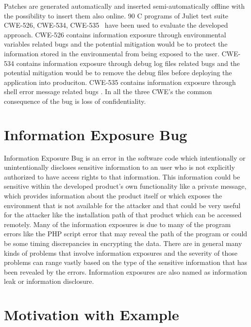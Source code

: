 Patches are generated automatically and inserted semi-automatically offline
with the possibility to insert them also online.
90 C programs of Juliet test suite CWE-526, CWE-534, CWE-535~\cite{mitre:CWE} have been used to evaluate the developed approach. 
CWE-526 contains
information exposure through environmental variables related bugs and the potential mitigation would be to protect the 
information stored in the environmental from being exposed to the user. CWE-534 contains information 
exposure through debug log files related bugs and the potential mitigation would be to remove the 
debug files before deploying the application into produciton. CWE-535 contains information exposure through
shell error message related bugs . In all the three CWE's the common consequence of the bug is
loss of confidentiality.




\section{Information Exposure Bug}

Information Exposure Bug is an error in the software code which intentionally or unintentionally discloses sensitive information to an user who is 
not explicitly authorized to have access rights to that information.
This information could be sensitive within the developed product's own functionality like a private message, which provides information
about the product itself or which exposes the environment that is not available for the attacker and that could be very useful for the attacker like the 
installation path of that product which can be accessed remotely.
Many of the information exposures is due to many of the program errors like the PHP script error that may reveal the path of the program or
could be some timing discrepancies in encrypting the data. There are in general many kinds of problems that involve information exposures and the severity
of those problems can range vastly based on the type of the sensitive information that has been revealed by the errors.
Information exposures are also named as information leak or information disclosure.

 \section{Motivation with Example}

